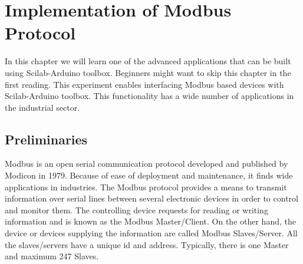 \chapter {Implementation of Modbus Protocol}
\thispagestyle{empty}
\label{modbus}

\newcommand{\LocMODfig}{\Origin/user-code/modbus/figures}
\newcommand{\LocMODscicode}{\Origin/user-code/modbus/scilab}
\newcommand{\LocMODscibrief}[1]{{\tt \seqsplit{%
Origin/user-code/modbus/scilab}}, see \fnrefp{fn:file-loc}}
\newcommand{\LocMODardcode}{\Origin/user-code/modbus/arduino}
\newcommand{\LocMODardbrief}[1]{{\tt \seqsplit{%
Origin/user-code/modbus/arduino}}, see \fnrefp{fn:file-loc}}

\newcommand{\LocMODpycode}{\Origin/user-code/modbus/python}
\newcommand{\LocMODpybrief}[1]{{\tt \seqsplit{%
Origin/user-code/modbus/python}}, see \fnrefp{fn:file-loc}}


\newcommand{\LocMODjuliacode}{\Origin/user-code/modbus/julia}
\newcommand{\LocMODjuliabrief}[1]{{\tt \seqsplit{%
Origin/user-code/modbus/julia}}, see \fnrefp{fn:file-loc}}




\newcommand{\LocMODOpenModelicacode}{\Origin/user-code/modbus/OpenModelica}
\newcommand{\LocMODOpenModelicabrief}[1]{{\tt \seqsplit{%
Origin/user-code/modbus/OpenModelica}}, see \fnrefp{fn:file-loc}}


In this chapter we will learn one of the advanced applications that
can be built using Scilab-Arduino toolbox. Beginners might want to
skip this chapter in the first reading. This experiment enables
interfacing Modbus based devices with Scilab-Arduino toolbox. This
functionality has a wide number of applications in the industrial
sector.

\section{Preliminaries}
Modbus is an open serial communication protocol developed and
published by Modicon in 1979. Because of ease of deployment and
maintenance, it finds wide applications in industries. The Modbus
protocol provides a means to transmit information over serial lines
between several electronic devices in order to control and monitor
them. The controlling device requests for reading or writing
information and is known as the Modbus Master/Client. On the other
hand, the device or devices supplying the information are called
Modbus Slaves/Server. All the slaves/servers have a unique id and
address. Typically, there is one Master and maximum 247 Slaves.

